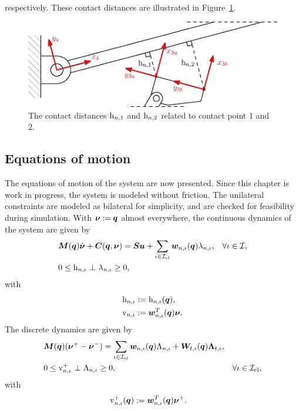 \documentclass[../DC2017114Bouma.tex]{subfiles}
\begin{document}
respectively. These contact distances are illustrated in Figure~\ref{fig:5guards}.
\begin{figure}[bt!]
\centering
\includegraphics[width=.7\textwidth]{guards.eps}\caption{The contact distances $\mathrm{h}_{n,1}$ and $\mathrm{h}_{n,2}$ related to contact point 1 and 2.}\label{fig:5guards}
\end{figure}

\subsection{Equations of motion}
The equations of motion of the system are now presented. Since this chapter is work in progress, the system is modeled without friction. The unilateral constraints are modeled as bilateral for simplicity, and are checked for feasibility during simulation. With $\boldsymbol{\nu} := {\boldsymbol{q}}$ almost everywhere, the continuous dynamics of the system are given by
\begin{align}
&{\boldsymbol{M}}({\boldsymbol{q}})\dot{\boldsymbol{\nu}} + {\boldsymbol{C}}({\boldsymbol{q}},\boldsymbol{\nu}) = {\boldsymbol{S}}{\boldsymbol{u}} + \sum_{\iota\in\mathcal{I}_{\text{cl}}}{\boldsymbol{w}}_{n,\iota}({\boldsymbol{q}})\lambda_{n,\iota}, &\forall \iota\in\mathcal{I}, \label{eq:5ncpcontact1}\\
&0\leq \mathrm{h}_{n,\iota}\ \bot\ \lambda_{n,\iota} \geq 0,\label{eq:5ncpcontact2}
\end{align}
with 
\begin{align}
&\mathrm{h}_{n,\iota} := \mathrm{h}_{n,\iota}({\boldsymbol{q}}),\label{eq:5h}\\
&\mathrm{v}_{n,\iota} := {\boldsymbol{w}}^T_{n,\iota}({\boldsymbol{q}}) \boldsymbol{\nu}.  \label{eq:5zetan}\\
\end{align}
The discrete dynamics are given by
\begin{align}
&{\boldsymbol{M}}({\boldsymbol{q}})(\boldsymbol{\nu}^+ - \boldsymbol{\nu}^-) = \sum_{\iota\in\mathcal{I}_{\text{cl}}} {\boldsymbol{w}}_{n,\iota}({\boldsymbol{q}})\Lambda_{n,\iota} + {\boldsymbol{W}}_{t,\iota}({\boldsymbol{q}})\boldsymbol{\Lambda}_{t,\iota}, \label{eq:5ncpimpact1}\\
&0\leq \mathrm{v}_{n,\iota}^+\ \bot\ \Lambda_{n,\iota} \geq 0, &\forall \iota\in\mathcal{I}_{\text{cl}},\label{eq:5ncpimpact2}
\end{align}
with 
\begin{align}
\mathrm{v}^+_{n,\iota}({\boldsymbol{q}}) &:= {\boldsymbol{w}}^T_{n,\iota}({\boldsymbol{q}}) \boldsymbol{\nu}^+.
\end{align}
\end{document}
